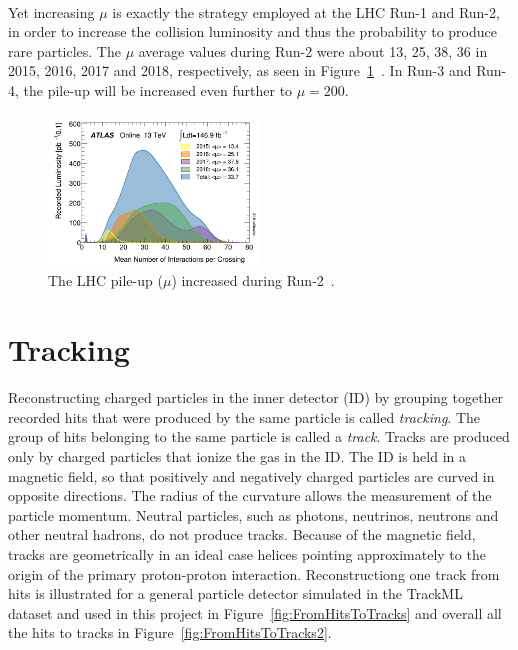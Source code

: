 \ \\Yet increasing $\mu$ is exactly the strategy employed at the LHC Run-1 and Run-2, in order to increase the collision luminosity and thus the probability to produce rare particles. The $\mu$ average values during Run-2 were about 13, 25, 38, 36 in 2015, 2016, 2017 and 2018, respectively, as seen in Figure~\ref{fig:LHCPileup}~\cite{ATLASPileup}. In Run-3 and Run-4, the pile-up will be increased even further to $\mu=200$.

\begin{figure}[!htb]
  \centering
  \includegraphics[width=0.5\textwidth]{plots/ATLAS_mu_2015_2018.png} 
  \caption{The LHC pile-up ($\mu$) increased during Run-2~\cite{ATLASPileup}.}
  \label{fig:LHCPileup}
\end{figure}

\section{Tracking}
\label{sec:Tracking}

Reconstructing charged particles in the inner detector (ID) by grouping together recorded hits that were produced by the same particle is called \emph{tracking}. The group of hits belonging to the same particle is called a \emph{track}. Tracks are produced only by charged particles that ionize the gas in the ID. The ID is held in a magnetic field, so that positively and negatively charged particles are curved in opposite directions. The radius of the curvature allows the measurement of the particle momentum. Neutral particles, such as photons, neutrinos, neutrons and other neutral hadrons, do not produce tracks. Because of the magnetic field, tracks are geometrically in an ideal case helices pointing approximately to the origin of the primary proton-proton interaction. Reconstructiong one track from hits is illustrated for a general particle detector simulated in the TrackML dataset and used in this project in Figure~\ref{fig:FromHitsToTracks} and overall all the hits to tracks in Figure~\ref{fig:FromHitsToTracks2}.

